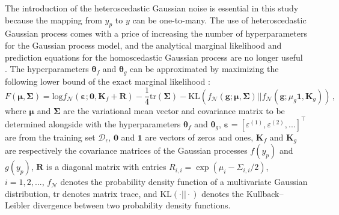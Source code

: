 \documentclass[number,preprint,3p]{elsarticle}
\def\tr{^\intercal}
\newcommand{\1}[2]{\mathbb{I}_{#1}\left(#2\right)}
\newcommand{\vect}[1]{\boldsymbol{#1}}
\begin{document}
	The introduction of the heteroscedastic Gaussian noise is essential in this study because the mapping from $y_p$ to $y$ can be one-to-many. The use of heteroscedastic Gaussian process comes with a price of increasing the number of hyperparameters for the Gaussian process model, and the analytical marginal likelihood and prediction equations for the homoscedastic Gaussian process are no longer useful \cite{lazaro2013retrieval,rogers2020probabilistic,kim2023estimation}. The hyperparameters $\vect{\theta}_{f}$ and $\vect{\theta}_{g}$ can be approximated by maximizing the following lower bound of the exact marginal likelihood \cite{lazaro2013retrieval}:
	\begin{equation}\label{likelihoodlowerbound}
		F(\vect{\mu} ,\vect{\Sigma} )=\textrm{log}f_{\mathcal{N}}(\vect{\varepsilon};\vect{0},\vect{K}_{f}+\vect{R})-\frac{1}{4}\textrm{tr}(\vect{\Sigma})-\textrm{KL}(f_{\mathcal{N}}(\vect{g};\vect{\mu},\vect{\Sigma})|| f_{\mathcal{N}}(\vect{g};\mu_{g}\vect{1},\vect{K}_{g})) \,,
	\end{equation}
	where $\vect{\mu}$ and $\vect{\Sigma}$ are the variational mean vector and covariance matrix to be determined alongside with the hyperparameters $\vect{\theta}_{f}$ and $\vect{\theta}_{g}$, $\vect{\varepsilon}=[{\varepsilon}^{(1)},{\varepsilon}^{(2)},...]\tr$ are from the training set $\mathcal{D}_\epsilon$, $\vect{0}$ and $\vect{1}$ are vectors of zeros and ones, $\vect{K}_{f}$ and $\vect{K}_{g}$ are respectively the covariance matrices of the Gaussian processes $f(y_{p})$ and $g(y_{p})$, $\vect{R}$ is a diagonal matrix with entries $R_{i,i}=\exp(\mu_{i}-\Sigma_{i,i}/2)$, $i=1,2,...$, $f_{\mathcal{N}}$ denotes the probability density function of a multivariate Gaussian distribution, $\textrm{tr}$ denotes matrix trace, and $\textrm{KL}(\cdot||\cdot)$ denotes the Kullback–Leibler divergence between two probability density functions. 
	
\end{document}
